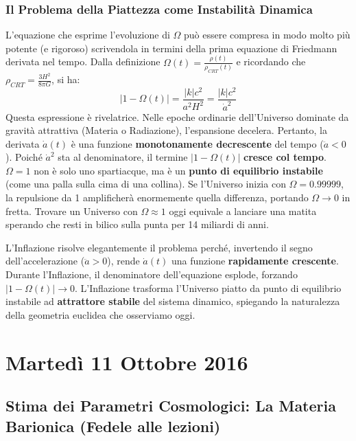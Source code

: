 \documentclass[11pt,a4paper]{report}
\begin{document}
\subsection{Il Problema della Piattezza come Instabilità Dinamica}
L'equazione che esprime l'evoluzione di $\Omega$ può essere compresa in modo molto più potente (e rigoroso) scrivendola in termini della prima equazione di Friedmann derivata nel tempo. Dalla definizione $\Omega(t) = \frac{\rho(t)}{\rho_{CRT}(t)}$ e ricordando che $\rho_{CRT} = \frac{3H^2}{8\pi G}$, si ha:
\begin{equation}
|1 - \Omega(t)| = \frac{|k|c^2}{a^2 H^2} = \frac{|k|c^2}{\dot{a}^2}
\end{equation}
Questa espressione è rivelatrice. Nelle epoche ordinarie dell'Universo dominate da gravità attrattiva (Materia o Radiazione), l'espansione decelera. Pertanto, la derivata $\dot{a}(t)$ è una funzione \textbf{monotonamente decrescente} del tempo ($\ddot{a} < 0$).
Poiché $\dot{a}^2$ sta al denominatore, il termine $|1-\Omega(t)|$ \textbf{cresce col tempo}.
$\Omega = 1$ non è solo uno spartiacque, ma è un \textbf{punto di equilibrio instabile} (come una palla sulla cima di una collina). Se l'Universo inizia con $\Omega = 0.99999$, la repulsione da 1 amplificherà enormemente quella differenza, portando $\Omega \to 0$ in fretta.
Trovare un Universo con $\Omega \approx 1$ oggi equivale a lanciare una matita sperando che resti in bilico sulla punta per 14 miliardi di anni.

L'Inflazione risolve elegantemente il problema perché, invertendo il segno dell'accelerazione ($\ddot{a} > 0$), rende $\dot{a}(t)$ una funzione \textbf{rapidamente crescente}. Durante l'Inflazione, il denominatore dell'equazione esplode, forzando $|1-\Omega(t)| \to 0$. L'Inflazione trasforma l'Universo piatto da punto di equilibrio instabile ad \textbf{attrattore stabile} del sistema dinamico, spiegando la naturalezza della geometria euclidea che osserviamo oggi.

\chapter{Martedì 11 Ottobre 2016}

\section{Stima dei Parametri Cosmologici: La Materia Barionica (Fedele alle lezioni)}
\end{document}
